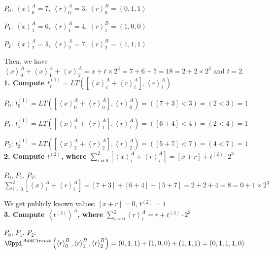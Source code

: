 $P_0$: $\left\langle x\right\rangle^A_0=7 $, $\left\langle r\right\rangle^A_0=3 $, $\left\langle r\right\rangle ^B_0=\left(0,1,1\right) $

$P_1$: $\left\langle x\right\rangle^A_1=6 $, $\left\langle r\right\rangle^A_1=4 $, $\left\langle r\right\rangle ^B_1=\left(1,0,0\right) $

$P_2$: $\left\langle x\right\rangle^A_2=5 $, $\left\langle r\right\rangle^A_2=7 $, $\left\langle r\right\rangle ^B_2=\left(1,1,1\right) $

Then, we have $\left\langle x\right\rangle^A_0+\left\langle x\right\rangle^A_1+\left\langle x\right\rangle^A_2=x+t\times 2^{3}=7+6+5=18=2+2\times 2^{3}$ and $t=2$.
\\

\textbf{1. Compute $t^{(1)}_i=LT\left(\left[\left\langle x\right\rangle_i^A + \left\langle r\right\rangle^A_i\right] ,\left\langle r\right\rangle^A_i \right)$}

$P_0$: $t^{(1)}_0=LT\left(\left[\left\langle x\right\rangle_0^A + \left\langle r\right\rangle^A_0\right] ,\left\langle r\right\rangle^A_0 \right)=\left(\left[7+3\right] <3\right)=\left(2 <3\right) =1$

$P_1$: $t^{(1)}_1=LT\left(\left[\left\langle x\right\rangle_1^A + \left\langle r\right\rangle^A_1\right] ,\left\langle r\right\rangle^A_1 \right)=\left(\left[6+4\right] <4\right)=\left(2 <4\right) =1$

$P_2$: $t^{(1)}_2=LT\left(\left[\left\langle x\right\rangle_2^A + \left\langle r\right\rangle^A_2\right] ,\left\langle r\right\rangle^A_2 \right)=\left(\left[5+7\right] <7\right)=\left(4 <7\right) =1$\\

\textbf{2. Compute $t^{(2)}$, where $ \sum_{i = 0}^{2}  \left[ \left\langle x\right\rangle_i^A+ \left\langle r\right\rangle^A_i \right]  =\left[x+r  \right]   + t^{(2)}\cdot 2^{3}$}

$P_0$, $P_1$, $P_2$: $\sum_{i = 0}^{2}  \left[ \left\langle x\right\rangle_i^A+ \left\langle r\right\rangle^A_i \right]=\left[7+3\right] +\left[6+4\right]+\left[5+7\right] =2+2+4=8=0+1\times 2^{3}$

We get publicly known values: $\left[x+r  \right]=0$, $t^{(2)}=1$\\

\textbf{3. Compute $\left\langle t^{\left(3\right) }\right\rangle^A$, where $\sum_{i = 0}^{2}\left\langle r\right\rangle^A_i=r+  t^{\left(3\right) } \cdot 2^{3}$}

$P_0$, $P_1$, $P_2$: $\Uppi^{AddCircuit}\left(\left\langle r\right\rangle ^B_0, \left\langle r\right\rangle ^B_1,\left\langle r\right\rangle ^B_2\right) =\left(0,1,1\right)+\left(1,0,0\right)+\left(1,1,1\right) =\left(0,1,1,1,0\right) $

